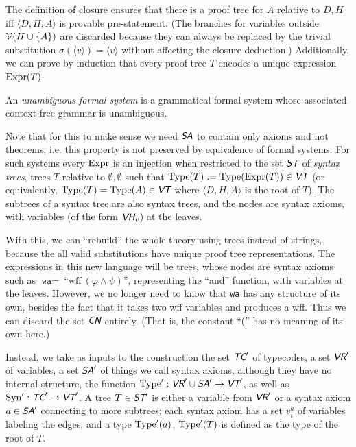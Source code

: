 \documentclass[runningheads,a4paper]{llncs}
\newcommand{\cn}{\textit{\textsf{CN}}} %
\newcommand{\vr}{\textit{\textsf{VR}}} %
\newcommand{\vh}{\textit{\textsf{VH}}} %
\newcommand{\tc}{\textit{\textsf{TC}}} %
\newcommand{\vt}{\textit{\textsf{VT}}} %
\newcommand{\sa}{\textit{\textsf{SA}}} %
\newcommand{\st}{\textit{\textsf{ST}}} %
\newcommand{\ang}[1]{\langle#1\rangle}
\newcommand{\vph}{\varphi}
\newcommand{\type}{{\rm Type}}
\newcommand{\syn}{{\rm Syn}}
\newcommand{\expr}{{\rm Expr}}
\begin{document}
The definition of closure ensures that there is a proof tree for $A$ relative to $D,H$ iff $\ang{D,H,A}$ is provable pre-statement. (The branches for variables outside ${\cal V}(H\cup\{A\})$ are discarded because they can always be replaced by the trivial substitution $\sigma(\ang{v})=\ang{v}$ without affecting the closure deduction.) Additionally, we can prove by induction that every proof tree $T$ encodes a unique expression $\expr(T)$.

\begin{definition}\label{def:unambig}
An {\em unambiguous formal system} is a grammatical formal system whose associated context-free grammar is unambiguous.
\end{definition}

\begin{remark}
Note that for this to make sense we need $\sa$ to contain only axioms and not theorems, i.e. this property is not preserved by equivalence of formal systems. For such systems every $\expr$ is an injection when restricted to the set $\st$ of {\em syntax trees}, trees $T$ relative to $\emptyset,\emptyset$ such that $\type(T):=\type(\expr(T))\in\vt$ (or equivalently, $\type(T)=\type(A)\in\vt$ where $\ang{D,H,A}$ is the root of $T$). The subtrees of a syntax tree are also syntax trees, and the nodes are syntax axioms, with variables (of the form $\vh_v$) at the leaves.
\end{remark}

With this, we can ``rebuild'' the whole theory using trees instead of strings, because the all valid substitutions have unique proof tree representations. The expressions in this new language will be trees, whose nodes are syntax axioms such as $\texttt{wa}=\ $``$\mathrm{wff}\ (\vph\land\psi)$'', representing the ``and'' function, with variables at the leaves. However, we no longer need to know that \texttt{wa} has any structure of its own, besides the fact that it takes two wff variables and produces a wff. Thus we can discard the set $\cn$ entirely. (That is, the constant ``('' has no meaning of its own here.)

Instead, we take as inputs to the construction the set $\tc'$ of typecodes, a set $\vr'$ of variables, a set $\sa'$ of things we call syntax axioms, although they have no internal structure, the function $\type':\vr'\cup\sa'\to\vt'$, as well as $\syn':\tc'\to\vt'$. A tree $T\in\st'$ is either a variable from $\vr'$ or a syntax axiom $a\in\sa'$ connecting to more subtrees; each syntax axiom has a set $v^a_i$ of variables labeling the edges, and a type $\type'(a)$; $\type'(T)$ is defined as the type of the root of $T$.
\end{document}
